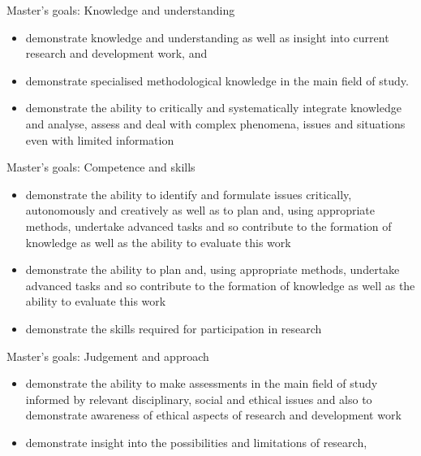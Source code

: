 \begin{frame}[fragile]
  \begin{block}{Master's goals: Knowledge and understanding~\cite{HEO2}}
    \begin{itemize}
      \item demonstrate knowledge and understanding \textelp{} as well as 
        insight into current research and development work, and
      \item demonstrate specialised methodological knowledge in the main 
        field of study.
      \item demonstrate the ability to critically and systematically 
        integrate knowledge and analyse, assess and deal with complex 
        phenomena, issues and situations even with limited information
    \end{itemize}
  \end{block}
\end{frame}

\begin{frame}[fragile]
  \begin{block}{Master's goals: Competence and skills~\cite{HEO2}}
    \begin{itemize}
      \item demonstrate the ability to identify and formulate issues 
        critically, autonomously and creatively as well as to plan and, 
        using appropriate methods, undertake advanced tasks \textelp{} and 
        so contribute to the formation of knowledge as well as the ability 
        to evaluate this work
      \item demonstrate the ability \textelp{} to plan and, using 
        appropriate methods, undertake advanced tasks \textelp{} and so 
        contribute to the formation of knowledge as well as the ability to 
        evaluate this work
      \item demonstrate the skills required for participation in research
        \textelp{}
    \end{itemize}
  \end{block}
\end{frame}

\begin{frame}[fragile]
  \begin{block}{Master's goals: Judgement and approach~\cite{HEO2}}
    \begin{itemize}
      \item demonstrate the ability to make assessments in the main field 
        of study informed by relevant disciplinary, social and ethical 
        issues and also to demonstrate awareness of ethical aspects of 
        research and development work
      \item demonstrate insight into the possibilities and limitations of 
        research, \textelp{}
    \end{itemize}
  \end{block}
\end{frame}


